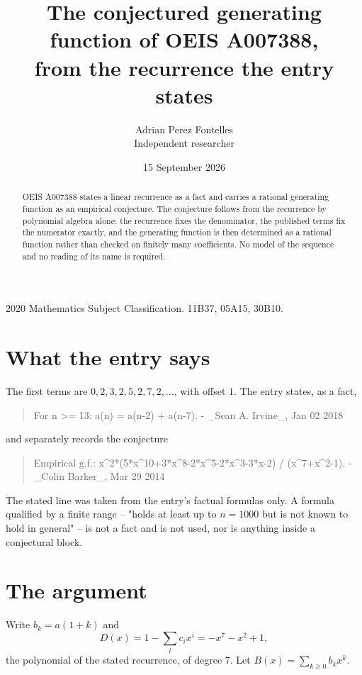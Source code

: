 \documentclass[11pt,a4paper]{article}
\title{The conjectured generating function of OEIS A007388,\\ \large from the recurrence the entry
states}
\author{Adrian Perez Fontelles\\ \small Independent researcher}
\date{15 September 2026}
\theoremstyle{plain}
\theoremstyle{definition}
\begin{document}
\maketitle

\begin{abstract}
OEIS A007388 states a linear recurrence as a fact and carries a rational generating function as an
empirical conjecture. The conjecture follows from the recurrence by polynomial algebra alone:
the recurrence fixes the denominator, the published terms fix the numerator exactly, and the
generating function is then determined as a rational function rather than checked on finitely
many coefficients. No model of the sequence and no reading of its name is required.
\end{abstract}

\noindent\small 2020 Mathematics Subject Classification. 11B37, 05A15, 30B10.\normalsize

\section{What the entry says}

The first terms are $0, 2, 3, 2, 5, 2, 7, 2,\dots$, with offset $1$. The entry states, as a fact,

\begin{quote}\raggedright For n >= 13: a(n) = a(n-2) + a(n-7). - \_Sean A. Irvine\_, Jan 02 2018\end{quote}

\noindent and separately records the conjecture

\begin{quote}\raggedright Empirical g.f.: x\^{}2*(5*x\^{}10+3*x\^{}8-2*x\^{}5-2*x\^{}3-3*x-2) / (x\^{}7+x\^{}2-1). - \_Colin Barker\_, Mar 29 2014\end{quote}

The stated line was taken from the entry's factual formulas only. A formula qualified by a
finite range -- "holds at least up to $n=1000$ but is not known to hold in general" -- is not a
fact and is not used, nor is anything inside a conjectural block.

\section{The argument}

Write $b_k=a(1+k)$ and
\[
  D(x)=1-\sum_{i} c_i x^{i}=- x^{7} - x^{2} + 1 ,
\]
the polynomial of the stated recurrence, of degree $7$. Let $B(x)=\sum_{k\ge0}b_kx^k$.
\end{document}

